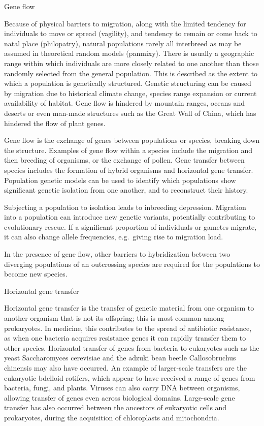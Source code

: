 Gene flow

Because of physical barriers to migration, along with the limited tendency for individuals to move or spread (vagility), and tendency to remain or come back to natal place (philopatry), natural populations rarely all interbreed as may be assumed in theoretical random models (panmixy). There is usually a geographic range within which individuals are more closely related to one another than those randomly selected from the general population. This is described as the extent to which a population is genetically structured. Genetic structuring can be caused by migration due to historical climate change, species range expansion or current availability of habitat. Gene flow is hindered by mountain ranges, oceans and deserts or even man-made structures such as the Great Wall of China, which has hindered the flow of plant genes.

Gene flow is the exchange of genes between populations or species, breaking down the structure. Examples of gene flow within a species include the migration and then breeding of organisms, or the exchange of pollen. Gene transfer between species includes the formation of hybrid organisms and horizontal gene transfer. Population genetic models can be used to identify which populations show significant genetic isolation from one another, and to reconstruct their history.

Subjecting a population to isolation leads to inbreeding depression. Migration into a population can introduce new genetic variants, potentially contributing to evolutionary rescue. If a significant proportion of individuals or gametes migrate, it can also change allele frequencies, e.g.~giving rise to migration load.

In the presence of gene flow, other barriers to hybridization between two diverging populations of an outcrossing species are required for the populations to become new species.

Horizontal gene transfer

Horizontal gene transfer is the transfer of genetic material from one organism to another organism that is not its offspring; this is most common among prokaryotes. In medicine, this contributes to the spread of antibiotic resistance, as when one bacteria acquires resistance genes it can rapidly transfer them to other species. Horizontal transfer of genes from bacteria to eukaryotes such as the yeast Saccharomyces cerevisiae and the adzuki bean beetle Callosobruchus chinensis may also have occurred. An example of larger-scale transfers are the eukaryotic bdelloid rotifers, which appear to have received a range of genes from bacteria, fungi, and plants. Viruses can also carry DNA between organisms, allowing transfer of genes even across biological domains. Large-scale gene transfer has also occurred between the ancestors of eukaryotic cells and prokaryotes, during the acquisition of chloroplasts and mitochondria.

